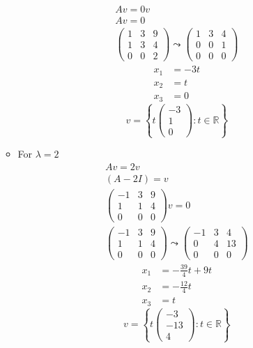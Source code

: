 \begin{enumerate}
\begin{itemize}
\begin{gather}
Av = 0v\\
Av = 0\\
\begin{pmatrix}
1 & 3 & 9\\
1 & 3 & 4\\
0 & 0 & 2
\end{pmatrix}
\leadsto
\begin{pmatrix}
1 & 3 & 4\\
0 & 0 & 1\\
0 & 0 & 0
\end{pmatrix}
\end{gather}
\begin{align}
x_1 &=-3t\\
x_2 &= t\\
x_3 &= 0
\end{align}
\begin{equation}
v= \left\{t\begin{pmatrix}-3\\1\\0\end{pmatrix}\colon t \in \mathbb{R}\right\}
\end{equation}
\item For $\lambda = 2$
\begin{gather}
Av = 2v\\
(A-2I) = v\\
\begin{pmatrix}
-1 & 3 & 9\\
1 & 1 & 4\\
0 & 0 & 0
\end{pmatrix}v =0\\
\begin{pmatrix}
-1 & 3 & 9\\
1 & 1 & 4\\
0 & 0 & 0
\end{pmatrix}
\leadsto
\begin{pmatrix}
-1 & 3 & 4\\
0 & 4 & 13\\
0 & 0 & 0
\end{pmatrix}
\end{gather}
\begin{align}
x_1 &= -\frac{39}{4}t +9t\\
x_2 &= -\frac{12}{4}t\\
x_3 &= t
\end{align}
\begin{equation}
v = \left\{t\begin{pmatrix}-3\\-13\\4\end{pmatrix}\colon t \in \mathbb{R}\right\}

\end{equation}
\end{itemize}
\end{enumerate}
